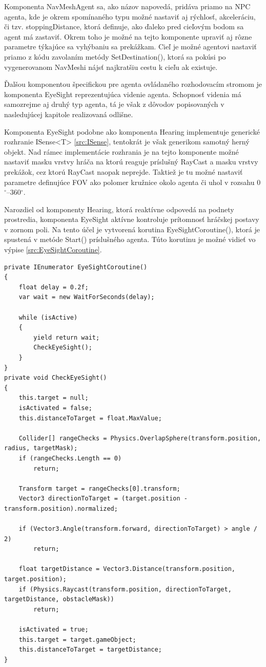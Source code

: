 \documentclass[slovak, master]{diploma}
\begin{document}
Komponenta NavMeshAgent sa, ako názov napovedá, pridáva priamo na NPC agenta, kde je okrem spomínaného typu možné nastaviť aj rýchlosť, akceleráciu, či tzv. stoppingDistance, ktorá definuje, ako ďaleko pred cieľovým bodom sa agent má zastaviť. Okrem toho je možné na tejto komponente upraviť aj rôzne parametre týkajúce sa vyhýbaniu sa prekážkam. Cieľ je možné agentovi nastaviť priamo z kódu zavolaním metódy SetDestination(), ktorá sa pokúsi po vygenerovanom NavMeshi nájsť najkratšiu cestu k cieľu ak existuje.

Ďalšou komponentou špecifickou pre agenta ovládaného rozhodovacím stromom je komponenta EyeSight reprezentujúca videnie agenta. Schopnosť videnia má samozrejme aj druhý typ agenta, tá je však z dôvodov popisovaných v nasledujúcej kapitole realizovaná odlišne.

Komponenta EyeSight podobne ako komponenta Hearing implementuje generické rozhranie ISense<T> \ref{src:ISense}, tentokrát je však generikom samotný herný objekt. Nad rámec implementácie rozhrania je na tejto komponente možné nastaviť masku vrstvy hráča na ktorú reaguje príslušný RayCast a masku vrstvy prekážok, cez ktorú RayCast naopak neprejde. Taktiež je tu možné nastaviť parametre definujúce FOV ako polomer kružnice okolo agenta či uhol v rozsahu 0$^{\circ}$--360$^{\circ}$.

Narozdiel od komponenty Hearing, ktorá reaktívne odpovedá na podnety prostredia, komponenta EyeSight aktívne kontroluje prítomnosť hráčskej postavy v zornom poli. Na tento účel je vytvorená korutina EyeSightCoroutine(), ktorá je spustená v metóde Start() príslušného agenta. Túto korutinu je možné vidieť vo výpise \ref{src:EyeSightCoroutine}.

\vspace{8pt}
\begin{lstlisting}[label=src:EyeSightCoroutine,caption={Korutina zabezpečujúca videnie agenta}]
private IEnumerator EyeSightCoroutine()
{
    float delay = 0.2f;
    var wait = new WaitForSeconds(delay);

    while (isActive)
    {
        yield return wait;
        CheckEyeSight();
    }
}
private void CheckEyeSight()
{
    this.target = null;
    isActivated = false;
    this.distanceToTarget = float.MaxValue;

    Collider[] rangeChecks = Physics.OverlapSphere(transform.position, radius, targetMask);
    if (rangeChecks.Length == 0)
        return;

    Transform target = rangeChecks[0].transform;
    Vector3 directionToTarget = (target.position - transform.position).normalized;

    if (Vector3.Angle(transform.forward, directionToTarget) > angle / 2)
        return;

    float targetDistance = Vector3.Distance(transform.position, target.position);
    if (Physics.Raycast(transform.position, directionToTarget, targetDistance, obstacleMask))
        return;

    isActivated = true;
    this.target = target.gameObject;
    this.distanceToTarget = targetDistance;
}
\end{lstlisting}
\end{document}
